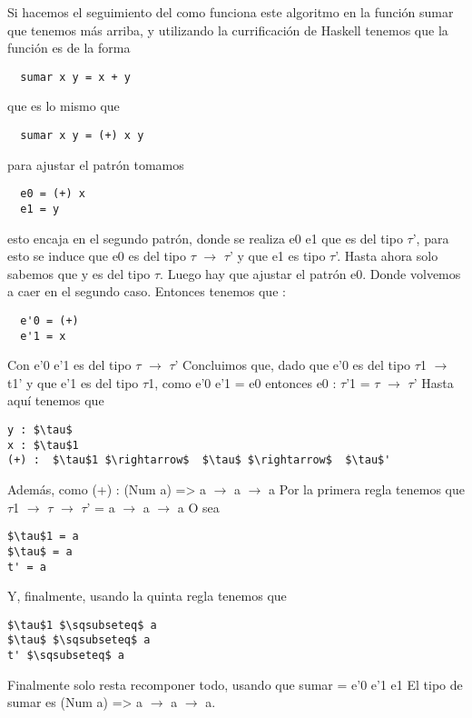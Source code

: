 Si hacemos el seguimiento del como funciona este algoritmo en la función sumar que tenemos más arriba, y utilizando la currificación de Haskell tenemos que la función es de la forma

\begin{lstlisting}
  sumar x y = x + y
\end{lstlisting}

que es lo mismo que

\begin{lstlisting}
  sumar x y = (+) x y
\end{lstlisting}

para ajustar el patrón tomamos

\begin{lstlisting}
  e0 = (+) x
  e1 = y
\end{lstlisting}

esto encaja en el segundo patrón, donde se realiza e0 e1 que es del tipo $\tau$', para esto se induce que e0 es del tipo $\tau$ $\rightarrow$ $\tau$' y que e1 es tipo $\tau$'. Hasta ahora solo sabemos que y es del tipo $\tau$.
Luego hay que ajustar el patrón e0. Donde volvemos a caer en el segundo caso. Entonces tenemos que :

\begin{lstlisting}
  e'0 = (+)
  e'1 = x
\end{lstlisting}

Con e'0 e'1 es del tipo $\tau$ $\rightarrow$ $\tau$'
Concluimos que, dado que e'0 es del tipo $\tau$1 $\rightarrow$ t1' y que e'1 es del tipo $\tau$1, como e'0 e'1 = e0
entonces e0 : $\tau$'1 = $\tau$ $\rightarrow$  $\tau$'
Hasta aquí tenemos que


\begin{lstlisting}[mathescape]
y : $\tau$
x : $\tau$1
(+) :  $\tau$1 $\rightarrow$  $\tau$ $\rightarrow$  $\tau$'
\end{lstlisting}

Además, como (+) : (Num a) => a $\rightarrow$ a $\rightarrow$ a
Por la primera regla tenemos que $\tau$1 $\rightarrow$  $\tau$ $\rightarrow$  $\tau$' = a $\rightarrow$ a $\rightarrow$ a
O sea

\begin{lstlisting}[mathescape]
$\tau$1 = a
$\tau$ = a
t' = a
\end{lstlisting}

Y, finalmente, usando la quinta regla tenemos que

\begin{lstlisting}[mathescape]
$\tau$1 $\sqsubseteq$ a
$\tau$ $\sqsubseteq$ a
t' $\sqsubseteq$ a
\end{lstlisting}

Finalmente solo resta recomponer todo, usando que sumar = e'0 e'1 e1
El tipo de sumar es (Num a) => a $\rightarrow$ a $\rightarrow$ a.

